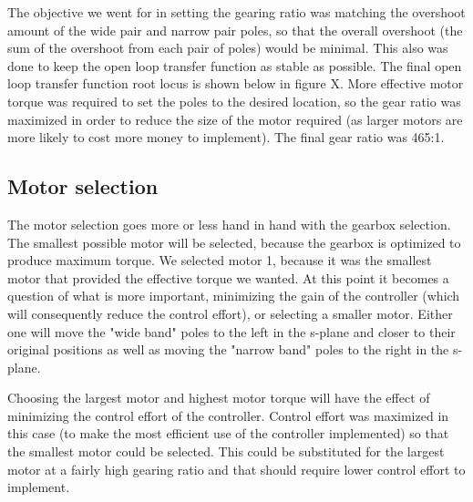 The objective we went for in setting the gearing ratio was matching the overshoot amount of the wide pair and narrow pair poles, so that the overall overshoot (the sum of the overshoot from each pair of poles) would be minimal. This also was done to keep the open loop transfer function as stable as possible. The final open loop transfer function root locus is shown below in figure X. More effective motor torque was required to set the poles to the desired location, so the gear ratio was maximized in order to reduce the size of the motor required (as larger motors are more likely to cost more money to implement). The final gear ratio was 465:1.



\subsection{Motor selection}

The motor selection goes more or less hand in hand with the gearbox selection. The smallest possible motor will be selected, because the gearbox is optimized to produce maximum torque. We selected motor 1, because it was the smallest motor that provided the effective torque we wanted. At this point it becomes a question of what is more important, minimizing the gain of the controller (which will consequently reduce the control effort), or selecting a smaller motor. Either one will move the "wide band" poles to the left in the s-plane and closer to their original positions as well as moving the "narrow band" poles to the right in the s-plane.

Choosing the largest motor and highest motor torque will have the effect of minimizing the control effort of the controller. Control effort was maximized in this case (to make the most efficient use of the controller implemented) so that the smallest motor could be selected. This could be substituted for the largest motor at a fairly high gearing ratio and that should require lower control effort to implement.